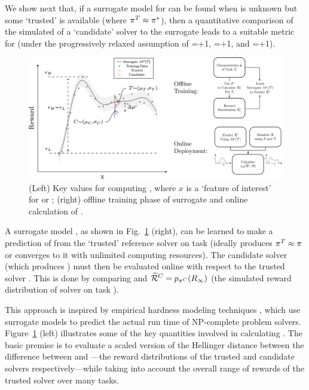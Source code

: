  We show next that, if a surrogate model for \rwdtrust{} can be found when \piopt{} is unknown but some `trusted' \pitrust{} is available (where $\pi^T \approx \pi^*$), then a quantitative comparison of the simulated \rwdcandsim{} of a `candidate' solver to the surrogate \rwdpredicted{} leads to a suitable metric for \xQ{} (under the progressively relaxed assumption of \xM{}=+1, \xP{}=+1, and \xI{}=+1).\brett{********}
    \begin{figure}[tb]
        \centering
        \includegraphics[width=0.79\linewidth]{Figures/SQ_AllCombined.png}
        \caption{(Left) Key values for computing \xQ, where $x$ is a `feature of interest' for \task or \solve; (right) offline training phase of surrogate \surrogate{} and online calculation of \xQ{}. }
        \label{fig:sq_v3}
        \vspace{-0.2cm}
    \end{figure}

A surrogate model \surrogate{}, as shown in Fig.~\ref{fig:sq_v3} (right), can be learned to make a prediction \rwdtrustpredict{} of \rwdtrust{} from the `trusted' reference solver \solvetrust{} on task \task{} (ideally \solvetrust{} produces $\mathcal{\pi}^T \approx \mathcal{\pi}$ or converges to it with unlimited computing resources). The candidate solver \solvecand{} (which produces \policycand) must then be evaluated online with respect to the trusted solver \solvetrust{}. This is done by comparing \rwdtrustpredict{} and $\widetilde{\mathcal{R}}^C= p_{\pi^C}(R_{\infty})$ (the simulated reward distribution of solver \solvecand{} on task \task). 

This approach is inspired by empirical hardness modeling techniques \cite{Leyton-Brown2009-yr}, which use surrogate models to predict the actual run time of NP-complete problem solvers. 
Figure~\ref{fig:sq_v3} (left) illustrates some of the key quantities involved in calculating \xQ{}. The basic premise is to evaluate a scaled version of the Hellinger distance between the difference between \rwdtrust{} and \rwd{}---the reward distributions of the trusted and candidate solvers respectively---while taking into account the overall range of rewards of the trusted solver over many tasks. 

